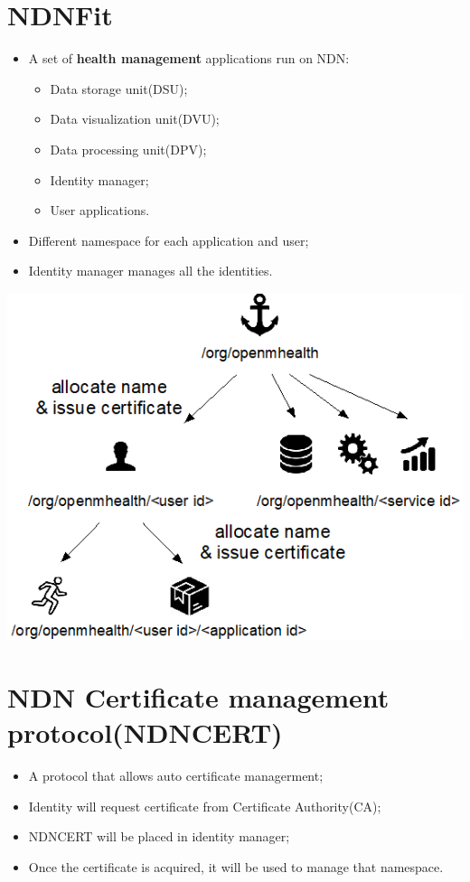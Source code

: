 \documentclass[a0,portrait]{poster}
\begin{document}
\begin{multicols}{2}
\begin{minipage}[b]{0.35\linewidth}
\section*{NDNFit\cite{zhang2018ndnfit}}
\par
	\begin{itemize}
		\item A set of \textbf{health management} applications run on NDN:
		\begin{itemize}
			\item Data storage unit(DSU);
			\item Data visualization unit(DVU);
			\item Data processing unit(DPV);
			\item Identity manager;
			\item User applications.
		\end{itemize}
		\item Different namespace for each application and user;
		\item Identity manager manages all the identities.
	\end{itemize}
\par
\end{minipage}
\begin{minipage}[b]{0.64\linewidth}
	\includegraphics[width=\linewidth]{figures/NDNfit.png}
\end{minipage}

\section*{NDN Certificate management protocol(NDNCERT)\cite{zhang2017ndncert}}
\begin{itemize}
	\item A protocol that allows auto certificate managerment;
	\item Identity will request certificate from Certificate Authority(CA);
	\item NDNCERT will be placed in identity manager;
	\item Once the certificate is acquired, it will be used to manage that namespace.
\end{itemize}


\end{multicols}
\end{document}
